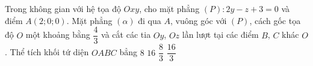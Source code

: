 \begin{ex}%
	Trong không gian với hệ tọa độ $O x y$, cho mặt phẳng $(P)\colon 2 y-z+3=0$ và điểm $A(2;0;0)$. Mặt phẳng $(\alpha)$ đi qua $A$, vuông góc với $(P)$, cách gốc tọa độ $O$ một khoảng bằng $\dfrac{4}{3}$ và cắt các tia $Oy$, $Oz$ lần lượt tại các điểm $B$, $C$ khác $O$. Thể tích khối tứ diện $OABC$ bẳng
	\choice
	{$8$}
	{$16$}
	{\True $\dfrac{8}{3}$}
	{$\dfrac{16}{3}$}
\end{ex}
